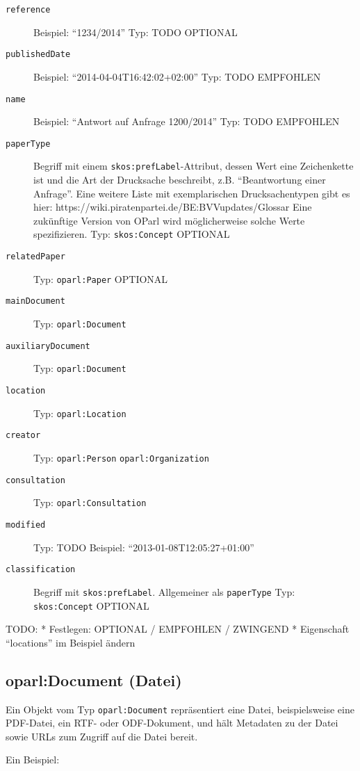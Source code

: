 \documentclass[,a4paper]{article}
\begin{document}
\begin{description}
\item[\texttt{reference}]
Beispiel: ``1234/2014'' Typ: TODO OPTIONAL
\item[\texttt{publishedDate}]
Beispiel: ``2014-04-04T16:42:02+02:00'' Typ: TODO EMPFOHLEN
\item[\texttt{name}]
Beispiel: ``Antwort auf Anfrage 1200/2014'' Typ: TODO EMPFOHLEN
\item[\texttt{paperType}]
Begriff mit einem \texttt{skos:prefLabel}-Attribut, dessen Wert eine
Zeichenkette ist und die Art der Drucksache beschreibt, z.B.
``Beantwortung einer Anfrage''. Eine weitere Liste mit exemplarischen
Drucksachentypen gibt es hier:
https://wiki.piratenpartei.de/BE:BVVupdates/Glossar Eine zukünftige
Version von OParl wird möglicherweise solche Werte spezifizieren. Typ:
\texttt{skos:Concept} OPTIONAL
\item[\texttt{relatedPaper}]
Typ: \texttt{oparl:Paper} OPTIONAL
\item[\texttt{mainDocument}]
Typ: \texttt{oparl:Document}
\item[\texttt{auxiliaryDocument}]
Typ: \texttt{oparl:Document}
\item[\texttt{location}]
Typ: \texttt{oparl:Location}
\item[\texttt{creator}]
Typ: \texttt{oparl:Person} \textbar{} \texttt{oparl:Organization}
\item[\texttt{consultation}]
Typ: \texttt{oparl:Consultation}
\item[\texttt{modified}]
Typ: TODO Beispiel: ``2013-01-08T12:05:27+01:00''
\item[\texttt{classification}]
Begriff mit \texttt{skos:prefLabel}. Allgemeiner als \texttt{paperType}
Typ: \texttt{skos:Concept} OPTIONAL
\end{description}

TODO: * Festlegen: OPTIONAL / EMPFOHLEN / ZWINGEND * Eigenschaft
``locations'' im Beispiel ändern

\subsection{oparl:Document (Datei)}\label{oparlux5fdocument}

Ein Objekt vom Typ \texttt{oparl:Document} repräsentiert eine Datei,
beispielsweise eine PDF-Datei, ein RTF- oder ODF-Dokument, und hält
Metadaten zu der Datei sowie URLs zum Zugriff auf die Datei bereit.

Ein Beispiel:
\end{document}
